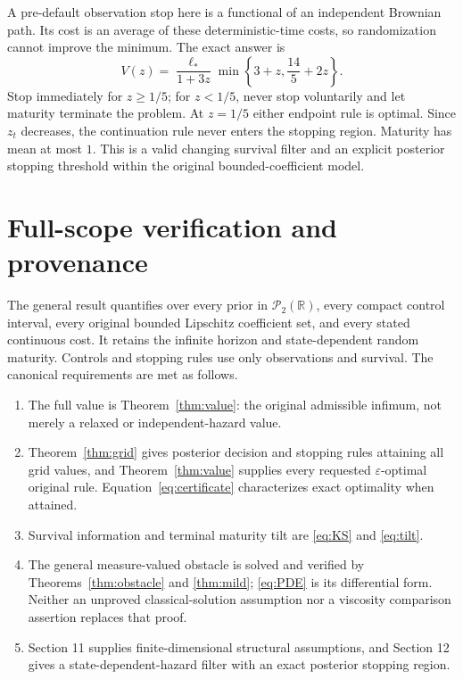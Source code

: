 \documentclass[11pt,a4paper]{article}
\theoremstyle{definition}
\theoremstyle{remark}
\newcommand{\R}{\mathbb R}
\newcommand{\Ptwo}{\mathcal P_2(\R)}
\begin{document}
A pre-default observation stop here is a functional of an independent
Brownian path. Its cost is an average of these deterministic-time
costs, so randomization cannot improve the minimum. The exact answer is
\begin{equation}\label{eq:example}
 V(z)=\frac{\ell_*}{1+3z}
          \min\left\{3+z,\frac{14}{5}+2z\right\}.
\end{equation}
Stop immediately for \(z\geq1/5\); for \(z<1/5\), never stop
voluntarily and let maturity terminate the problem.
At \(z=1/5\) either endpoint rule is optimal. Since \(z_t\) decreases,
the continuation rule never enters the stopping region. Maturity
has mean at most \(1\). This is a valid changing survival filter
and an explicit posterior stopping threshold within the original
bounded-coefficient model.

\section{Full-scope verification and provenance}

The general result quantifies over every prior in \(\Ptwo\), every
compact control interval, every original bounded Lipschitz
coefficient set, and every stated continuous cost. It retains the
infinite horizon and state-dependent random maturity. Controls
and stopping rules use only observations and survival.
The canonical requirements are met as follows.
\begin{enumerate}
\item The full value is Theorem~\ref{thm:value}: the original
admissible infimum, not merely a relaxed or independent-hazard value.
\item Theorem~\ref{thm:grid} gives posterior decision and stopping
rules attaining all grid values, and Theorem~\ref{thm:value} supplies
every requested \(\varepsilon\)-optimal original rule.
Equation~\eqref{eq:certificate} characterizes exact optimality
when attained.
\item Survival information and terminal maturity tilt are
\eqref{eq:KS} and \eqref{eq:tilt}.
\item The general measure-valued obstacle is solved and verified
by Theorems~\ref{thm:obstacle} and \ref{thm:mild};
\eqref{eq:PDE} is its differential form.
Neither an unproved classical-solution assumption nor a viscosity
comparison assertion replaces that proof.
\item Section 11 supplies finite-dimensional structural assumptions,
and Section 12 gives a state-dependent-hazard filter with an exact
posterior stopping region.
\end{enumerate}
\end{document}
